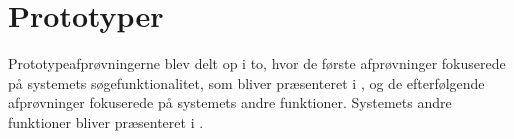 \section{Prototyper}
\label{sec:prototyper}
Prototypeafprøvningerne blev delt op i to, hvor de første afprøvninger fokuserede på systemets søgefunktionalitet, som bliver præsenteret i , og de efterfølgende afprøvninger fokuserede på systemets andre funktioner. Systemets andre funktioner bliver præsenteret i .



